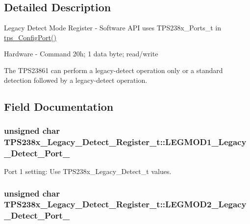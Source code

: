\subsection{Detailed Description}
Legacy Detect Mode Register -\/ Software A\-P\-I uses T\-P\-S238x\-\_\-\-Ports\-\_\-t in \hyperlink{_t_p_s23861_8c_a2b787818ef7e374af218c952d3ca8a08}{tps\-\_\-\-Config\-Port()} \par
 Hardware -\/ Command 20h; 1 data byte; read/write \par
\par
 The T\-P\-S23861 can perform a legacy-\/detect operation only or a standard detection followed by a legacy-\/detect operation. 

\subsection{Field Documentation}
\hypertarget{struct_t_p_s238x___legacy___detect___register__t_ad94e0297bc8ebfad0329c43a2a9cb78a}{
\subsubsection[{L\-E\-G\-M\-O\-D1\-\_\-\-Legacy\-\_\-\-Detect\-\_\-\-Port\-\_\-1}]{\setlength{\rightskip}{0pt plus 5cm}unsigned char T\-P\-S238x\-\_\-\-Legacy\-\_\-\-Detect\-\_\-\-Register\-\_\-t\-::\-L\-E\-G\-M\-O\-D1\-\_\-\-Legacy\-\_\-\-Detect\-\_\-\-Port\-\_}}\label{struct_t_p_s238x___legacy___detect___register__t_ad94e0297bc8ebfad0329c43a2a9cb78a}


Port 1 setting\-: Use T\-P\-S238x\-\_\-\-Legacy\-\_\-\-Detect\-\_\-t values. 

\hypertarget{struct_t_p_s238x___legacy___detect___register__t_a909aa93edfd901520efdec0cf68d229c}{
\subsubsection[{L\-E\-G\-M\-O\-D2\-\_\-\-Legacy\-\_\-\-Detect\-\_\-\-Port\-\_\-2}]{\setlength{\rightskip}{0pt plus 5cm}unsigned char T\-P\-S238x\-\_\-\-Legacy\-\_\-\-Detect\-\_\-\-Register\-\_\-t\-::\-L\-E\-G\-M\-O\-D2\-\_\-\-Legacy\-\_\-\-Detect\-\_\-\-Port\-\_}}\label{struct_t_p_s238x___legacy___detect___register__t_a909aa93edfd901520efdec0cf68d229c}


